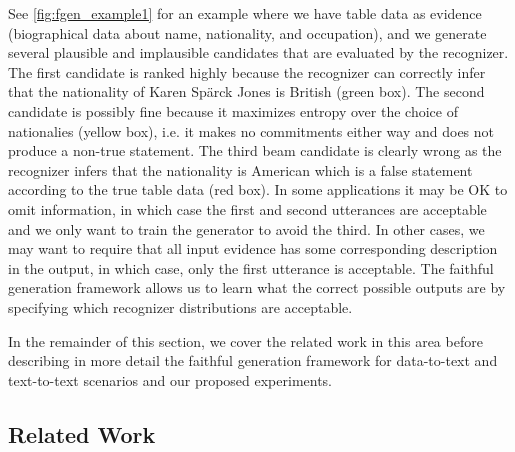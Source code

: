 See \autoref{fig:fgen_example1} for an example 
where we have table data as evidence (biographical data about name, nationality, and 
occupation), and we generate several plausible and implausible 
candidates that are evaluated by the recognizer.
The first candidate is 
 ranked highly because the recognizer can correctly infer that the 
 nationality of Karen Sp\"arck Jones is British (green box). The second 
 candidate is possibly fine because it maximizes entropy over the choice 
 of nationalies (yellow box), i.e. it makes no commitments either way and does
 not produce a non-true statement. The third beam candidate is clearly wrong
 as the recognizer infers that the nationality is American which is a false
 statement according to the true table data (red box).
 In some applications it may be OK to omit information, in which case the first
 and second utterances are acceptable and we only want to train the generator to
 avoid the third. In other cases, we may want to require that all input
 evidence has some corresponding description in the output, in which case,
 only the first utterance is acceptable. 
 The faithful generation framework allows us to learn what the correct possible outputs are  
 by specifying which recognizer distributions are acceptable. 

In the remainder of this section, we cover the related work in this area
before describing in more detail the faithful generation framework for 
data-to-text and text-to-text scenarios and our proposed experiments.

\subsection{Related Work}


